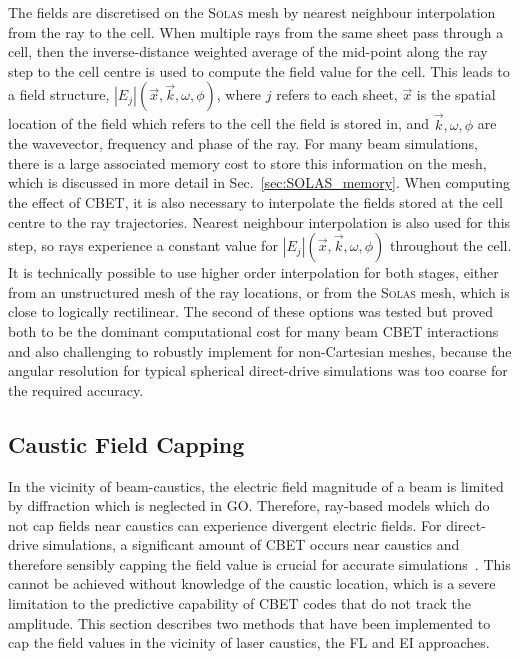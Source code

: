 The fields are discretised on the \textsc{Solas} mesh by nearest neighbour interpolation from the ray to the cell.
When multiple rays from the same sheet pass through a cell, then the inverse-distance weighted average of the mid-point along the ray step to the cell centre is used to compute the field value for the cell.
This leads to a field structure, $|E_j|(\vec{x},\vec{k},\omega,\phi)$, where $j$ refers to each sheet, $\vec{x}$ is the spatial location of the field which refers to the cell the field is stored in, and $\vec{k},\omega,\phi$ are the wavevector, frequency and phase of the ray.
For many beam simulations, there is a large associated memory cost to store this information on the mesh, which is discussed in more detail in Sec.~\ref{sec:SOLAS_memory}.
When computing the effect of \ac{CBET}, it is also necessary to interpolate the fields stored at the cell centre to the ray trajectories.
Nearest neighbour interpolation is also used for this step, so rays experience a constant value for $|E_j|(\vec{x},\vec{k},\omega,\phi)$ throughout the cell.
It is technically possible to use higher order interpolation for both stages, either from an unstructured mesh of the ray locations, or from the \textsc{Solas} mesh, which is close to logically rectilinear.
The second of these options was tested but proved both to be the dominant computational cost for many beam \ac{CBET} interactions and also challenging to robustly implement for non-Cartesian meshes, because the angular resolution for typical spherical direct-drive simulations was too coarse for the required accuracy.

\subsection{Caustic Field Capping}%
\label{sec:SOLAS_caustic_cap}
In the vicinity of beam-caustics, the electric field magnitude of a beam is limited by diffraction which is neglected in \ac{GO}.
Therefore, ray-based models which do not cap fields near caustics can experience divergent electric fields.
For direct-drive simulations, a significant amount of \ac{CBET} occurs near caustics and therefore sensibly capping the field value is crucial for accurate simulations~\cite{colaitis_adaptive_2019}.
This cannot be achieved without knowledge of the caustic location, which is a severe limitation to the predictive capability of \ac{CBET} codes that do not track the amplitude.
This section describes two methods that have been implemented to cap the field values in the vicinity of laser caustics, the \ac{FL} and \ac{EI} approaches.

